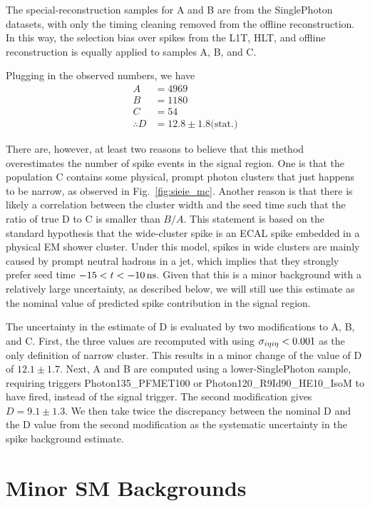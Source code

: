 The special-reconstruction samples for A and B are from the SinglePhoton datasets, with only the timing cleaning removed from the offline reconstruction.
In this way, the selection bias over spikes from the L1T, HLT, and offline reconstruction is equally applied to samples A, B, and C.

Plugging in the observed numbers, we have
\begin{align*}
  A & = 4969 \\
  B & = 1180 \\
  C & = 54 \\
  \therefore D & = 12.8 \pm 1.8 \text{(stat.)}
\end{align*}

There are, however, at least two reasons to believe that this method overestimates the number of spike events in the signal region. 
One is that the population C contains some physical, prompt photon clusters that just happens to be narrow, as observed in Fig.~\ref{fig:sieie_mc}. 
Another reason is that there is likely a correlation between the cluster width and the seed time such that the ratio of true D to C is smaller than $B/A$.
This statement is based on the standard hypothesis that the wide-cluster spike is an ECAL spike embedded in a physical EM shower cluster. 
Under this model, spikes in wide clusters are mainly caused by prompt neutral hadrons in a jet, which implies that they strongly prefer seed time $-15 < t < -10\, \text{ns}$. 
Given that this is a minor background with a relatively large uncertainty, as described below, we will still use this estimate as the nominal value of predicted spike contribution in the signal region.

The uncertainty in the estimate of D is evaluated by two modifications to A, B, and C.
First, the three values are recomputed with using $\sigma_{i\eta i\eta} < 0.001$ as the only definition of narrow cluster. 
This results in a minor change of the value of D of $12.1 \pm 1.7$. Next, A and B are computed using a lower-\pt SinglePhoton sample, requiring triggers Photon135\_PFMET100 or Photon120\_R9Id90\_HE10\_IsoM to have fired, instead of the signal trigger. 
The second modification gives $D=9.1 \pm 1.3$. 
We then take twice the discrepancy between the nominal D and the D value from the second modification as the systematic uncertainty in the spike background estimate.

\section{Minor SM Backgrounds}
\label{sec:minorsm}

